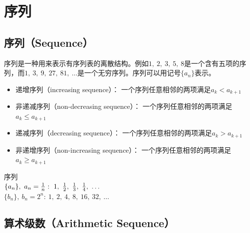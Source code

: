 \documentclass[12pt, openany, oneside]{book}
\begin{document}
\begin{table}[H]
	\centering
	\caption{埃拉托斯特尼筛法}
\end{table}

\newpage

\section{序列}

\subsection{序列（Sequence）}

序列是一种用来表示有序列表的离散结构。例如$ 1,\ 2,\ 3,\ 5,\ 8 $是一个含有五项的序列，而$ 1,\ 3,\ 9,\ 27,\ 81,\ \dots $是一个无穷序列。序列可以用记号$ \{a_n\} $表示。

\begin{itemize}
	\item 递增序列（increasing sequence）： 一个序列任意相邻的两项满足$ a_k < a_{k+1} $
	\item 非递减序列（non-decreasing sequence）： 一个序列任意相邻的两项满足$ a_k \le a_{k+1} $
	\item 递减序列（decreasing sequence）： 一个序列任意相邻的两项满足$ a_k > a_{k+1} $
	\item 非递增序列（non-increasing sequence）： 一个序列任意相邻的两项满足$ a_k \ge a_{k+1} $
\end{itemize}

\begin{tcolorbox}
	序列 \\
	$ \{a_n\},\ a_n = {1 \over n}:\ 1,\ {1 \over 2},\ {1 \over 3},\ {1 \over 4},\ \dots $ \\
	$ \{b_n\},\ b_n = 2^n:\ 1,\ 2,\ 4,\ 8,\ 16,\ 32,\ \dots $
\end{tcolorbox}

\subsection{算术级数（Arithmetic Sequence）}
\end{document}
